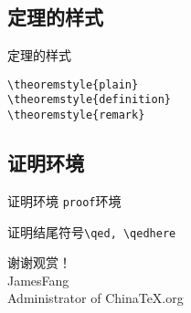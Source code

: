\documentclass[t]{beamer}
\begin{document}
\subsection{定理的样式}
\begin{frame}[fragile]{定理的样式}
\begin{verbatim}
\theoremstyle{plain}
\theoremstyle{definition}
\theoremstyle{remark}
\end{verbatim}

\end{frame}





\subsection{证明环境}
\begin{frame}[fragile]{证明环境}
\verb"proof"环境

证明结尾符号\verb"\qed, \qedhere"
\end{frame}


\begin{frame}
\begin{center}\Huge
{\color{red}谢谢观赏！}\\
JamesFang\\
Administrator of {\color{blue}China\TeX{}.org}
\end{center}
\end{frame}
\end{document}
